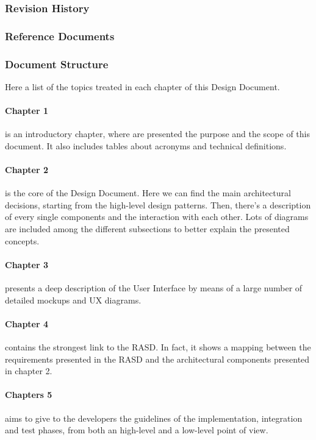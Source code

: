 \documentclass[]{article}
\begin{document}
			
		\subsubsection{Revision History}
		
		
		\subsubsection{Reference Documents}
		
		
		\subsubsection{Document Structure}
		
			Here a list of the topics treated in each chapter of this Design Document.
			
			\paragraph{Chapter 1} is an introductory chapter, where are presented the purpose and the scope of this document. It also includes tables about acronyms and technical definitions.	
			
			\paragraph{Chapter 2} is the core of the Design Document. Here we can find the main architectural decisions, starting from the high-level design patterns. Then, there's a description of every single components and the interaction with each other. Lots of diagrams are included among the different subsections to better explain the presented concepts.
			
			\paragraph{Chapter 3} presents a deep description of the User Interface by means of a large number of detailed mockups and UX diagrams.
			
			\paragraph{Chapter 4} contains the strongest link to the RASD. In fact, it shows a mapping between the requirements presented in the RASD and the architectural components presented in chapter 2.
			
			\paragraph{Chapters 5} aims to give to the developers the guidelines of the implementation, integration and test phases, from both an high-level and a low-level point of view.
		
\end{document}
